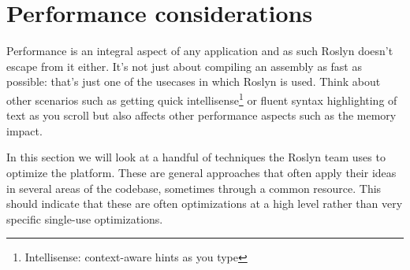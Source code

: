 \section{Performance considerations}
\label{sec:performance}

Performance is an integral aspect of any application and as such Roslyn doesn't escape from it either. It's not just about compiling an assembly as fast as possible: that's just one of the usecases in which Roslyn is used. Think about other scenarios such as getting quick intellisense\footnote{Intellisense: context-aware hints as you type} or fluent syntax highlighting of text as you scroll but also affects other performance aspects such as the memory impact.

In this section we will look at a handful of techniques the Roslyn team uses to optimize the platform. These are general approaches that often apply their ideas in several areas of the codebase, sometimes through a common resource. This should indicate that these are often optimizations at a high level rather than very specific single-use optimizations. 










